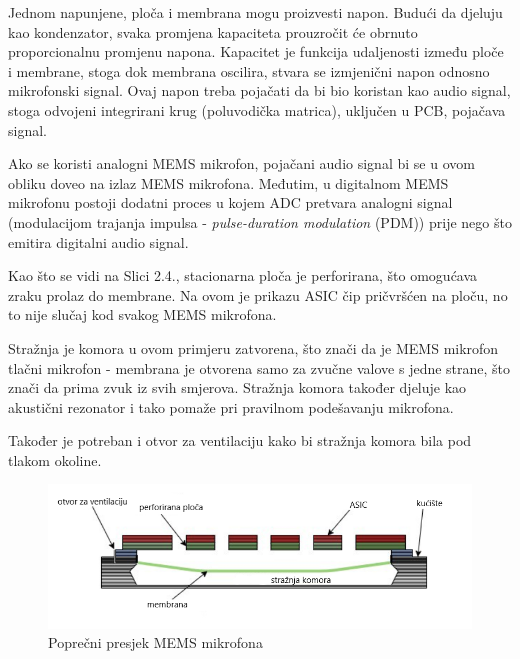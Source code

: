 Jednom napunjene, ploča i membrana mogu proizvesti napon. Budući da djeluju kao kondenzator, svaka promjena kapaciteta prouzročit će obrnuto proporcionalnu promjenu napona. Kapacitet je funkcija udaljenosti između ploče i membrane, stoga dok membrana oscilira, stvara se izmjenični napon odnosno mikrofonski signal. Ovaj napon treba pojačati da bi bio koristan kao audio signal, stoga odvojeni integrirani krug (poluvodička matrica), uključen u PCB, pojačava signal.

Ako se koristi analogni MEMS mikrofon, pojačani audio signal bi se u ovom obliku doveo na izlaz MEMS mikrofona.  Međutim, u digitalnom MEMS mikrofonu postoji dodatni proces u kojem ADC pretvara analogni signal (modulacijom trajanja impulsa - \textit{pulse-duration modulation} (PDM)) prije nego što emitira digitalni audio signal.

Kao što se vidi na Slici 2.4., stacionarna ploča je perforirana, što omogućava zraku prolaz do membrane. Na ovom je prikazu ASIC čip pričvršćen na ploču, no to nije slučaj kod svakog MEMS mikrofona. 

Stražnja je komora u ovom primjeru zatvorena, što znači da je MEMS mikrofon tlačni mikrofon - membrana je otvorena samo za zvučne valove s jedne strane, što znači da prima zvuk iz svih smjerova. Stražnja komora također djeluje kao akustični rezonator i tako pomaže pri pravilnom podešavanju mikrofona.

Također je potreban i otvor za ventilaciju kako bi stražnja komora bila pod tlakom okoline.

\begin{figure}[ht]
	\includegraphics[width=\linewidth]{imgs/mems_mic}
	\caption{Poprečni presjek MEMS mikrofona}
	\label{fig:mems-mic}
\end{figure}